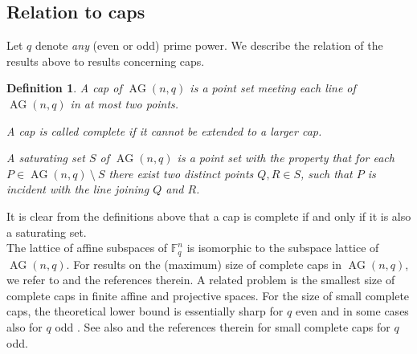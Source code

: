 \documentclass[11pt]{article}
\numberwithin{table}{section}
\newcommand{\F}{{\mathbb F}}
\newtheorem{definition}[theorem]{Definition}
\theoremstyle{definition}
\DeclareMathOperator{\AG}{{AG}}
\begin{document}
	
	
	\subsection{Relation to caps}
	
	Let $q$ denote  {\em any} (even or odd) prime power. We describe the relation of the results above  to results concerning caps.
	
	\begin{definition}
		A cap of $\AG(n,q)$ is a point set meeting each line of $\AG(n,q)$ in at most two points. 
		
		\smallskip
		
		A cap is called complete if it cannot be extended to a larger cap.
		
		\smallskip
		
		A saturating set $S$ of $\AG(n,q)$ is a point set with the property that for each $P \in \AG(n,q) ~\setminus~ S$ there exist two distinct points $Q,R \in S$, such that $P$ is incident with the line joining $Q$ and $R$.
	\end{definition}
	
	It is clear from the definitions above that a cap is complete if and only if it is also a saturating set.\\
	The lattice of affine subspaces of $\F_q^n$ is isomorphic to the subspace lattice of $\AG(n,q)$. %
	For results on the (maximum) size of complete caps in $\AG(n,q)$, we refer to \cite{EB, Edel, EPPP, Ty} and the references therein. 
	A related problem is the smallest size of complete caps in finite affine and projective spaces. For the size of small complete caps, the theoretical lower bound is essentially sharp for $q$ even \cite{evencap4, evencap3, evencap2, evencap1} and in some cases also for $q$ odd \cite{completecap}. See also \cite{Anbar, Bartoli, DO, Giuli} and the references therein for small complete caps for $q$ odd.
	
\end{document}

